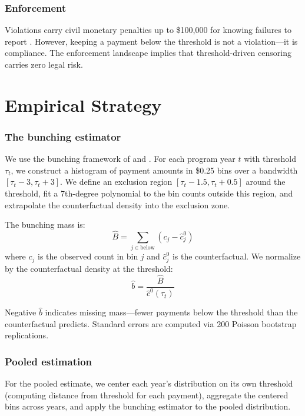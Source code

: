 \documentclass[12pt]{article}
\begin{document}
\subsubsection*{Enforcement} Violations carry civil monetary penalties up to \$100,000 for knowing failures to report \citep{agrawal2019disclosure}. However, keeping a payment below the threshold is not a violation---it is compliance. The enforcement landscape implies that threshold-driven censoring carries zero legal risk.

\section{Empirical Strategy}

\subsubsection*{The bunching estimator} We use the bunching framework of \citet{saez2010taxpayers} and \citet{kleven2016bunching}. For each program year $t$ with threshold $\tau_t$, we construct a histogram of payment amounts in \$0.25 bins over a bandwidth $[\tau_t - 3, \tau_t + 3]$. We define an exclusion region $[\tau_t - 1.5, \tau_t + 0.5]$ around the threshold, fit a 7th-degree polynomial to the bin counts outside this region, and extrapolate the counterfactual density into the exclusion zone.

The bunching mass is:
\begin{equation}
\hat{B} = \sum_{j \in \text{below}} \left( c_j - \hat{c}_j^0 \right)
\end{equation}
where $c_j$ is the observed count in bin $j$ and $\hat{c}_j^0$ is the counterfactual. We normalize by the counterfactual density at the threshold:
\begin{equation}
\hat{b} = \frac{\hat{B}}{\hat{c}^0(\tau_t)}
\end{equation}

Negative $\hat{b}$ indicates missing mass---fewer payments below the threshold than the counterfactual predicts. Standard errors are computed via 200 Poisson bootstrap replications.

\subsubsection*{Pooled estimation} For the pooled estimate, we center each year's distribution on its own threshold (computing distance from threshold for each payment), aggregate the centered bins across years, and apply the bunching estimator to the pooled distribution.
\end{document}
